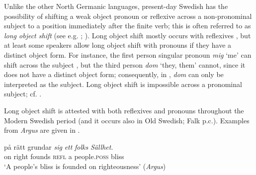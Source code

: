 \documentclass[output=paper]{langscibook}
\begin{document}
Unlike the other North Germanic languages, present-day Swedish has the possibility of shifting a weak object pronoun or reflexive across a non-pronominal subject to a position immediately after the finite verb; this is often referred to as \textit{long object shift} (see e.g. \citealt{Holmberg1986}; \citealt{Heinat2010}). Long object shift mostly occurs with reflexives , but at least some speakers allow long object shift with pronouns if they have a distinct object form. For instance, the first person singular pronoun \textit{mig} ‘me’ can shift across the subject , but the third person \textit{dom} ‘they, them’ cannot, since it does not have a distinct object form; consequently, in , \textit{dom} can only be interpreted as the subject. Long object shift is impossible across a pronominal subject; cf. .


\ea \label{ex:intro:20}




\z
\z


Long object shift is attested with both reflexives and pronouns throughout the Modern Swedish period (and it occurs also in Old Swedish; Falk p.c.). Examples from \textit{Argus} are given in .


\ea \label{ex:intro:21}
\ea
\gll  på rätt   grundar \textit{sig} \textit{ett} \textit{folks} \textit{Sällhet}. \\
    on right founds    \textsc{refl}   a   people\textsc{.poss}   bliss\\
    \glt `A people’s bliss is founded on righteousness’ (\textit{Argus})
\end{document}
